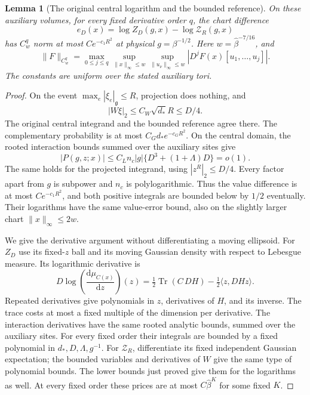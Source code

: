 \documentclass[11pt,reqno]{amsart}
\numberwithin{equation}{section}
\newtheorem{lemma}[theorem]{Lemma}
\theoremstyle{definition}
\theoremstyle{remark}
\newcommand{\dd}{\mathrm d}
\newcommand{\g}{\mathfrak g}
\begin{document}
\begin{lemma}[The original central logarithm and the bounded reference]
\label{lem:connected-central-comparison}
On these auxiliary volumes, for every fixed
derivative order \(q\), the chart difference
\[
                    e_D(x)=\log Z_D(g,x)-\log\mathcal Z_R(g,x)
\]
has \(C_w^q\) norm at most \(Ce^{-c_1R^2}\)
at physical \(g=\beta^{-1/2}\).
Here \(w=\widehat\beta^{-7/16}\), and
\begin{equation}
 \|F\|_{C_w^q}
   =\max_{0\le j\le q}
      \sup_{\|x\|_\infty\le w}
      \sup_{\|u_\nu\|_\infty\le w}
                         |D^jF(x)[u_1,\ldots,u_j]|.
 \label{eq:connected-global-chart-norm}
\end{equation}
The constants are uniform over the stated
auxiliary tori.
\end{lemma}
\begin{proof}
On the event
\(\max_e|\xi_e|_{\g}\le R\), projection
does nothing, and
\[
              |W\xi|_2\le C_W\sqrt{d_*}R\le D/4 .
\]
The original central integrand and the
bounded reference agree there.
The complementary probability is at
most \(C_Gd_*e^{-c_GR^2}\).
On the central domain, the rooted
interaction bounds summed over the
auxiliary sites give
\[
         |P(g,z;x)|
             \le C_Ln_c|g|\{D^3+(1+\Lambda)D\}=o(1).
\]
The same holds for the projected
integrand, using \(|z^R|_2\le D/4\).
Every factor apart from \(g\) is
subpower and \(n_c\) is polylogarithmic.
Thus the value difference is at most
\(Ce^{-c_1R^2}\), and both positive
integrals are bounded below by \(1/2\)
eventually. Their logarithms have the
same value-error bound, also on the
slightly larger chart
\(\|x\|_\infty\le2w\).

We give the derivative argument without
differentiating a moving ellipsoid.
For \(Z_D\) use its fixed-\(z\) ball
and its moving Gaussian density with
respect to Lebesgue measure.
Its logarithmic derivative is
\[
       D\log\left(\frac{\dd\mu_{C(x)}}{\dd z}\right)(z)
          =\tfrac12\operatorname{Tr}(C\,DH)
                              -\tfrac12\langle z,DH z\rangle .
\]
Repeated derivatives give polynomials
in \(z\), derivatives of \(H\),
and its inverse. The trace costs at
most a fixed multiple of the dimension
per derivative. The interaction
derivatives have the same rooted
analytic bounds, summed over the
auxiliary sites.
For every fixed order their integrals
are bounded by a fixed polynomial
in \(d_*,D,\Lambda,g^{-1}\).
For \(\mathcal Z_R\), differentiate
its fixed independent Gaussian
expectation; the bounded variables
and derivatives of \(W\) give the
same type of polynomial bounds.
The lower bounds just proved give
them for the logarithms as well.
At every fixed order these prices
are at most \(C\widehat\beta^K\)
for some fixed \(K\).


\end{proof}
\end{document}
